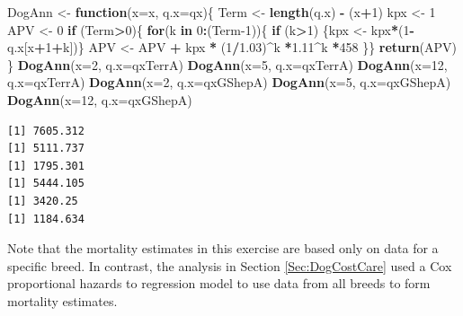 \documentclass[
]{book}
\newenvironment{Shaded}{\begin{snugshade}}{\end{snugshade}}
\newcommand{\ControlFlowTok}[1]{\textcolor[rgb]{0.13,0.29,0.53}{\textbf{#1}}}
\newcommand{\DataTypeTok}[1]{\textcolor[rgb]{0.13,0.29,0.53}{#1}}
\newcommand{\DecValTok}[1]{\textcolor[rgb]{0.00,0.00,0.81}{#1}}
\newcommand{\FloatTok}[1]{\textcolor[rgb]{0.00,0.00,0.81}{#1}}
\newcommand{\KeywordTok}[1]{\textcolor[rgb]{0.13,0.29,0.53}{\textbf{#1}}}
\newcommand{\NormalTok}[1]{#1}
\newcommand{\OperatorTok}[1]{\textcolor[rgb]{0.81,0.36,0.00}{\textbf{#1}}}
\newcommand{\StringTok}[1]{\textcolor[rgb]{0.31,0.60,0.02}{#1}}
\begin{document}
\begin{Shaded}
\begin{Highlighting}[]
\NormalTok{DogAnn <-}\StringTok{ }\ControlFlowTok{function}\NormalTok{(}\DataTypeTok{x=}\NormalTok{x, }\DataTypeTok{q.x=}\NormalTok{qx)\{}
\NormalTok{  Term <-}\StringTok{ }\KeywordTok{length}\NormalTok{(q.x) }\OperatorTok{-}\StringTok{ }\NormalTok{(x}\OperatorTok{+}\DecValTok{1}\NormalTok{)}
\NormalTok{  kpx <-}\StringTok{ }\DecValTok{1} 
\NormalTok{  APV  <-}\StringTok{ }\DecValTok{0} 
 \ControlFlowTok{if}\NormalTok{ (Term}\OperatorTok{>}\DecValTok{0}\NormalTok{)\{ }\ControlFlowTok{for}\NormalTok{(k }\ControlFlowTok{in} \DecValTok{0}\OperatorTok{:}\NormalTok{(Term}\DecValTok{-1}\NormalTok{))\{ }
    \ControlFlowTok{if}\NormalTok{ (k}\OperatorTok{>}\DecValTok{1}\NormalTok{) \{kpx <-}\StringTok{ }\NormalTok{kpx}\OperatorTok{*}\NormalTok{(}\DecValTok{1}\OperatorTok{-}\NormalTok{q.x[x}\OperatorTok{+}\DecValTok{1}\OperatorTok{+}\NormalTok{k])\}}
\NormalTok{    APV  <-}\StringTok{ }\NormalTok{APV  }\OperatorTok{+}\StringTok{ }\NormalTok{kpx }\OperatorTok{*}\StringTok{  }\NormalTok{(}\DecValTok{1}\OperatorTok{/}\FloatTok{1.03}\NormalTok{)}\OperatorTok{^}\NormalTok{k   }\OperatorTok{*}\FloatTok{1.11}\OperatorTok{^}\NormalTok{k }\OperatorTok{*}\DecValTok{458}
\NormalTok{    \}\}}
 \KeywordTok{return}\NormalTok{(APV)}
\NormalTok{  \}}
\KeywordTok{DogAnn}\NormalTok{(}\DataTypeTok{x=}\DecValTok{2}\NormalTok{, }\DataTypeTok{q.x=}\NormalTok{qxTerrA)}
\KeywordTok{DogAnn}\NormalTok{(}\DataTypeTok{x=}\DecValTok{5}\NormalTok{, }\DataTypeTok{q.x=}\NormalTok{qxTerrA)}
\KeywordTok{DogAnn}\NormalTok{(}\DataTypeTok{x=}\DecValTok{12}\NormalTok{, }\DataTypeTok{q.x=}\NormalTok{qxTerrA)}
\KeywordTok{DogAnn}\NormalTok{(}\DataTypeTok{x=}\DecValTok{2}\NormalTok{, }\DataTypeTok{q.x=}\NormalTok{qxGShepA)}
\KeywordTok{DogAnn}\NormalTok{(}\DataTypeTok{x=}\DecValTok{5}\NormalTok{, }\DataTypeTok{q.x=}\NormalTok{qxGShepA)}
\KeywordTok{DogAnn}\NormalTok{(}\DataTypeTok{x=}\DecValTok{12}\NormalTok{, }\DataTypeTok{q.x=}\NormalTok{qxGShepA)}
\end{Highlighting}
\end{Shaded}

\begin{verbatim}
[1] 7605.312
[1] 5111.737
[1] 1795.301
[1] 5444.105
[1] 3420.25
[1] 1184.634
\end{verbatim}

Note that the mortality estimates in this exercise are based only on data for a specific breed. In contrast, the analysis in Section \ref{Sec:DogCostCare} used a Cox proportional hazards to regression model to use data from all breeds to form mortality estimates.
\end{document}

